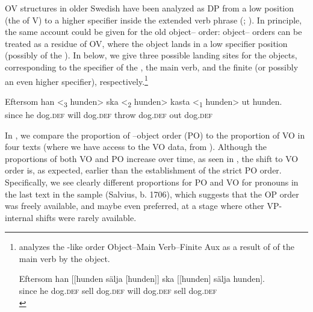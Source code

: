 \documentclass[output=paper]{langscibook}
\begin{document}
OV structures in older Swedish have been analyzed as DP  from a low  position (the  of V) to a higher specifier inside the extended verb phrase (\citealt{Delsing1999}; \citealt{Petzell2011, Petzell2012}). In principle, the same account could be given for the old object– order: object– orders can be treated as a residue of OV, where the object lands in a low specifier position (possibly of the ). In  below, we give three possible landing sites for the objects, corresponding to the specifier of the , the main verb, and the finite  (or possibly an even higher specifier), respectively.\footnote{\citet{Petzell2012} analyzes the -like order Object–Main Verb–Finite Aux as a result of  of the main verb by the object.

    \ea
    \gll  Eftersom    han [[hunden   sälja [hunden]]   ska [[hunden]   sälja   hunden].\\
    since   he     dog.\textsc{def}   sell       dog.\textsc{def}     will   dog.\textsc{def}     sell   dog.\textsc{def}\\
    \z}


\ea\label{ex:lalu:46}
\gll Eftersom  han {<\textsubscript{3} hunden>}   ska   {<\textsubscript{2} hunden>} kasta     {<\textsubscript{1} hunden>}   ut     hunden.\\
since        he      dog\textsc{.def}  will     dog\textsc{.def}  throw        dog\textsc{.def}   out   dog\textsc{.def}\\
\z


In , we compare the proportion of –object order (PO) to the proportion of VO in four texts (where we have access to the VO data, from \citealt{Petzell2012}). Although the proportions of both VO and PO increase over time, as seen in , the shift to VO order is, as expected, earlier than the establishment of the strict PO order. Specifically, we see clearly different proportions for PO and VO for pronouns in the last text in the sample (Salvius, b. 1706), which suggests that the OP order was freely available, and maybe even preferred, at a stage where other VP-internal shifts were rarely available.\largerpage
\end{document}

